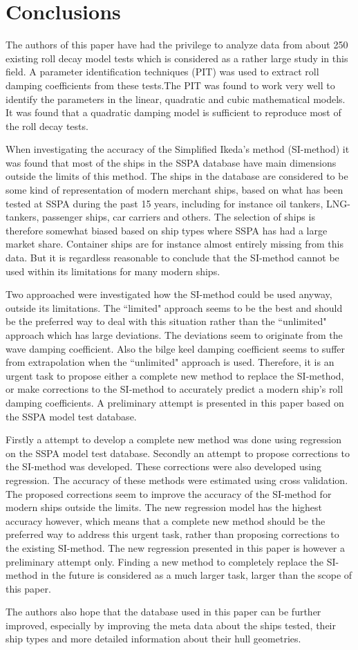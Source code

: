 \section{Conclusions}
\label{se:conclusions}
The authors of this paper have had the privilege to analyze data from about 250 existing roll decay model tests which is considered as a rather large study in this field. A parameter identification techniques (PIT) was used to extract roll damping coefficients from these tests.The PIT was found to work very well to identify the parameters in the linear, quadratic and cubic mathematical models. 
It was found that a quadratic damping model is sufficient to reproduce most of the roll decay tests.

When investigating the accuracy of the Simplified Ikeda's method (SI-method) it was found that most of the ships in the SSPA database have main dimensions outside the limits of this method. The ships in the database are considered to be some kind of representation of modern merchant ships, based on what has been tested at SSPA during the past 15 years, including for instance oil tankers, LNG-tankers, passenger ships, car carriers and others. The selection of ships is therefore somewhat biased based on ship types where SSPA has had a large market share. Container ships are for instance almost entirely missing from this data. But it is regardless reasonable to conclude that the SI-method cannot be used within its limitations for many modern ships. 

Two approached were investigated how the SI-method could be used anyway, outside its limitations. The ``limited" approach seems to be the best and should be the preferred way to deal with this situation rather than the ``unlimited" approach which has large deviations. The deviations seem to originate from the wave damping coefficient. Also the bilge keel damping coefficient seems to suffer from extrapolation when the ``unlimited" approach is used. 
Therefore, it is an urgent task to propose either a complete new method to replace the SI-method, or make corrections to the SI-method to accurately predict a modern ship’s roll damping coefficients. A preliminary attempt is presented in this paper based on the SSPA model test database.

Firstly a attempt to develop a complete new method was done using regression on the SSPA model test database. Secondly an attempt to propose corrections to the SI-method was developed. These corrections were also developed using regression. The accuracy of these methods were estimated using cross validation. The proposed corrections seem to improve the accuracy of the SI-method for modern ships outside the limits. The new regression model has the highest accuracy however, which means that a complete new method should be the preferred way to address this urgent task, rather than proposing corrections to the existing SI-method. The new regression presented in this paper is however a preliminary attempt only. Finding a new method to completely replace the SI-method in the future is considered as a much larger task, larger than the scope of this paper. 

The authors also hope that the database used in this paper can be further improved, especially by improving the meta data about the ships tested, their ship types and more detailed information about their hull geometries. 



